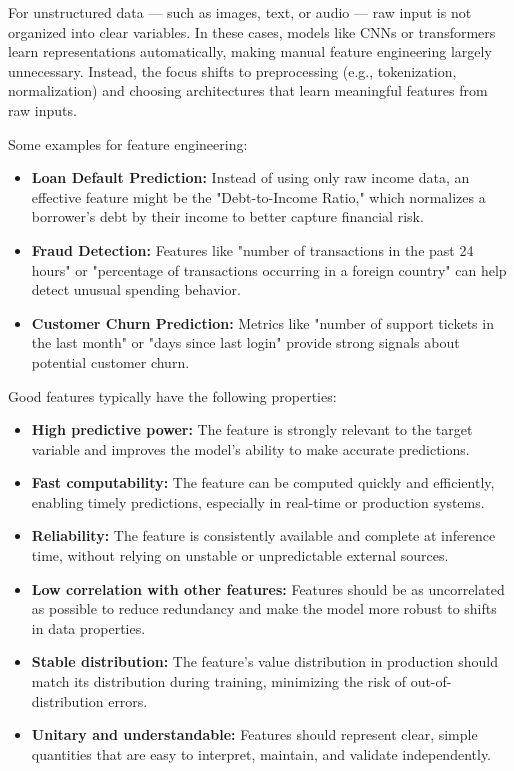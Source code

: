 \documentclass[12pt,openany]{book}
\begin{document}
For unstructured data — such as images, text, or audio — raw input is not organized into clear variables. In these cases, models like CNNs or transformers learn representations automatically, making manual feature engineering largely unnecessary. Instead, the focus shifts to preprocessing (e.g., tokenization, normalization) and choosing architectures that learn meaningful features from raw inputs.


Some examples for feature engineering:
\begin{itemize}
    \item \textbf{Loan Default Prediction:} Instead of using only raw income data, an effective feature might be the "Debt-to-Income Ratio," which normalizes a borrower’s debt by their income to better capture financial risk.
    \item \textbf{Fraud Detection:} Features like "number of transactions in the past 24 hours" or "percentage of transactions occurring in a foreign country" can help detect unusual spending behavior.
    \item \textbf{Customer Churn Prediction:} Metrics like "number of support tickets in the last month" or "days since last login" provide strong signals about potential customer churn.
\end{itemize}

Good features typically have the following properties:

\begin{itemize}
    \item \textbf{High predictive power:} The feature is strongly relevant to the target variable and improves the model's ability to make accurate predictions.
    \item \textbf{Fast computability:} The feature can be computed quickly and efficiently, enabling timely predictions, especially in real-time or production systems.
    \item \textbf{Reliability:} The feature is consistently available and complete at inference time, without relying on unstable or unpredictable external sources.
    \item \textbf{Low correlation with other features:} Features should be as uncorrelated as possible to reduce redundancy and make the model more robust to shifts in data properties.
    \item \textbf{Stable distribution:} The feature's value distribution in production should match its distribution during training, minimizing the risk of out-of-distribution errors.
    \item \textbf{Unitary and understandable:} Features should represent clear, simple quantities that are easy to interpret, maintain, and validate independently.
\end{itemize}
\end{document}
